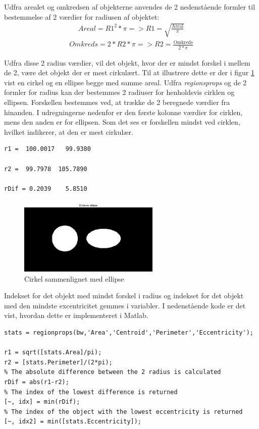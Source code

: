 Udfra arealet og omkredsen af objekterne anvendes de 2 nedenstående formler til bestemmelse af 2 værdier for radiusen af objektet:
\begin{align}
Areal = R1^2*\pi => R1 = \sqrt{\frac{\text{Areal}}{\pi}}
\end{align}
\begin{align}
Omkreds = 2*R2*\pi => R2 = \frac{\text{Omkreds}}{2*\pi}
\end{align}

Udfra disse 2 radius værdier, vil det objekt, hvor der er mindst forskel i mellem de 2, være det objekt der er mest cirkulært. Til at illustrere dette er der i figur \ref{fig:circleelip} vist en cirkel og en ellipse begge med samme areal. Udfra \textit{regionsprops} og de 2 formler for radius kan der bestemmes 2 radiuser for henholdsvis cirklen og ellipsen. Forskellen bestemmes ved, at trække de 2 beregnede værdier fra hinanden. I udregningerne nedenfor er den første kolonne værdier for cirklen, mens den anden er for ellipsen. Som det ses er forskellen mindst ved cirklen, hvilket indikerer, at den er mest cirkulær.
  
\begin{lstlisting} 
r1 =  100.0017   99.9380

r2 =  99.7978  105.7890

rDif = 0.2039    5.8510
\end{lstlisting} 

\begin{figure}[H]
	\centering
	\includegraphics[width=0.6\textwidth]{billeder/software/circleellipse.png}
	\caption{Cirkel sammenlignet med ellipse}
	\label{fig:circleelip}
\end{figure}

Indekset for det objekt med mindst forskel i radius og indekset for det objekt med den mindste excentricitet gemmes i variabler. I nedenstående kode er det vist, hvordan dette er implementeret i Matlab.

\begin{lstlisting} 
stats = regionprops(bw,'Area','Centroid','Perimeter','Eccentricity');

r1 = sqrt([stats.Area]/pi);
r2 = [stats.Perimeter]/(2*pi);
% The absolute difference between the 2 radius is calculated
rDif = abs(r1-r2);
% The index of the lowest difference is returned
[~, idx] = min(rDif);
% The index of the object with the lowest eccentricity is returned 
[~, idx2] = min([stats.Eccentricity]);
\end{lstlisting} 

